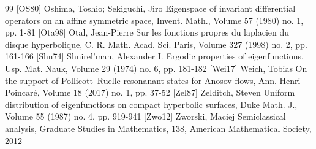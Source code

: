 \begin{thebibliography}{99}
 [OS80] Oshima, Toshio; Sekiguchi, Jiro Eigenspace of invariant differential operators on an affine symmetric space, Invent. Math., Volume 57 (1980) no. 1, pp. 1-81
 [Ota98] Otal, Jean-Pierre Sur les fonctions propres du laplacien du disque hyperbolique, C. R. Math. Acad. Sci. Paris, Volume 327 (1998) no. 2, pp. 161-166
 [Shn74] Shnirel’man, Alexander I. Ergodic properties of eigenfunctions, Usp. Mat. Nauk, Volume 29 (1974) no. 6, pp. 181-182
 [Wei17] Weich, Tobias On the support of Pollicott–Ruelle resonanant states for Anosov flows, Ann. Henri Poincaré, Volume 18 (2017) no. 1, pp. 37-52
 [Zel87] Zelditch, Steven Uniform distribution of eigenfunctions on compact hyperbolic surfaces, Duke Math. J., Volume 55 (1987) no. 4, pp. 919-941
 [Zwo12] Zworski, Maciej Semiclassical analysis, Graduate Studies in Mathematics, 138, American Mathematical Society, 2012
\end{thebibliography}
